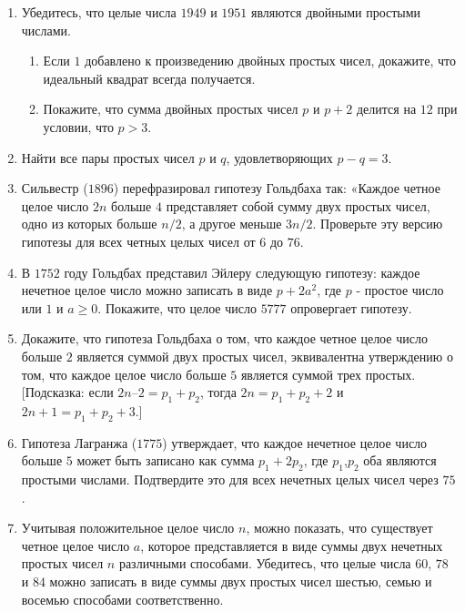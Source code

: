\documentclass[11pt]{article}
\begin{document}
\begin{enumerate}
\item Убедитесь, что целые числа $1949$ и $1951$ являются двойными простыми числами.

\begin{enumerate}
\item Если $1$ добавлено к произведению двойных простых чисел, докажите, что идеальный квадрат всегда получается.
\item Покажите, что сумма двойных простых чисел $p$ и $p+ 2$ делится на $12$ при условии, что $p>3$.
\end{enumerate}

\item	Найти все пары простых чисел $p$ и $q$, удовлетворяющих $p - q = 3$.

\item	Сильвестр ($1896$) перефразировал гипотезу Гольдбаха так: «Каждое четное целое число $2n$ больше $4$ представляет собой сумму двух простых чисел, одно из которых больше $n/2$, а другое меньше $3n/2$. Проверьте эту версию гипотезы для всех четных целых чисел от $6$ до $76$.

\item	В $1752$ году Гольдбах представил Эйлеру следующую гипотезу: каждое нечетное целое число можно записать в виде $p + 2a^2$, где $p$ - простое число или $1$ и $ a \geq 0$. Покажите, что целое число $5777$ опровергает гипотезу.

\item	Докажите, что гипотеза Гольдбаха о том, что каждое четное целое число больше $2$ является суммой двух простых чисел, эквивалентна утверждению о том, что каждое целое число больше $5$ является суммой трех простых. [Подсказка: если $2n–2=
p_1+p_2$, тогда $2n = p_1+p_2+2$ и $2n+1 = p_1 + p_2 + 3$.]

\item	Гипотеза Лагранжа ($1775$) утверждает, что каждое нечетное целое число больше $5$ может быть записано как сумма $p_1 + 2p_2$, где $p_1$,$p_2$ оба являются простыми числами. Подтвердите это для всех нечетных целых чисел через $75$.

\item	Учитывая положительное целое число $n$, можно показать, что существует четное целое число $a$, которое представляется в виде суммы двух нечетных простых чисел $n$ различными способами. Убедитесь, что целые числа $60$, $78$ и $84$ можно записать в виде суммы двух простых чисел шестью, семью и восемью способами соответственно.


\end{enumerate}
\end{document}
